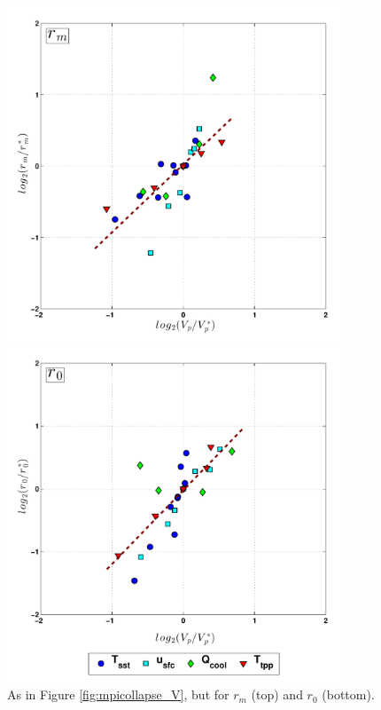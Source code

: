 \documentclass[12pt]{article}
\begin{document}
\begin{figure}[h!]
\centering
  \noindent\includegraphics[width=10cm,height=10cm]{FIGURES_TC_RCE_equilibrium_v2.0/Fig4a_MPI_collapse_rm.pdf}
  
  \noindent\includegraphics[width=10cm,height=10cm]{FIGURES_TC_RCE_equilibrium_v2.0/Fig4b_MPI_collapse_r0.pdf}
\caption{As in Figure \ref{fig:mpicollapse_V}, but for $r_m$ (top) and $r_{0}$ (bottom).}
\label{fig:mpicollapse_r}
\end{figure}
\end{document}
